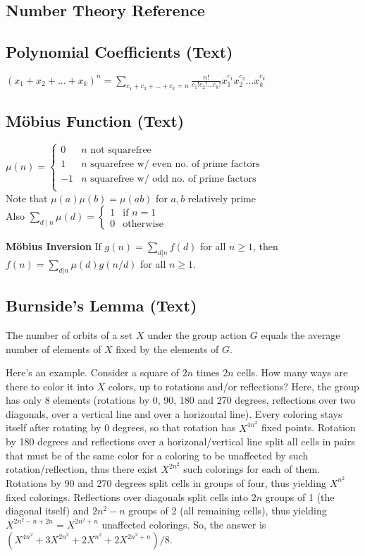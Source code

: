 \documentclass[9pt]{extarticle}
\begin{document}
\begin{multicols*}{3}
\section{Number Theory Reference}
\subsection{Polynomial Coefficients (Text)} %
$(x_1 + x_2 + ... + x_k)^n = \sum_{c_1 + c_2 + ... + c_k = n}
\frac{n!}{c_1! c_2! ... c_k!} x_1^{c_1} x_2^{c_2} ... x_k^{c_k}$

\subsection{M\"obius Function (Text)} %
$\mu(n) = \begin{cases}
0 & \text{$n$ not squarefree} \\
1 & \text{$n$ squarefree w/ even no. of prime factors} \\
-1 & \text{$n$ squarefree w/ odd no. of prime factors} \\
\end{cases}$ \\
Note that $\mu(a) \mu(b) = \mu(ab)$ for $a, b$ relatively prime \\
Also $\sum_{d \mid n} \mu(d) = \begin{cases} 1 & \text{if $n = 1$} \\
0 & \text{otherwise} \end{cases}$

\textbf{M\"obius Inversion}
If $g(n) = \sum_{d|n} f(d)$ for all $n \ge 1$, then
$f(n) = \sum_{d|n} \mu(d)g(n/d)$ for all $n \ge 1$.

\subsection{Burnside's Lemma (Text)} %
The number of orbits of a set $X$ under the group action $G$ equals the average
number of elements of $X$ fixed by the elements of $G$.

Here's an example. Consider a square of $2n$ times $2n$ cells. How many ways
are there to color it into $X$ colors, up to rotations and/or reflections?
Here, the group has only 8 elements (rotations by 0, 90, 180 and 270 degrees,
reflections over two diagonals, over a vertical line and over a horizontal
line). Every coloring stays itself after rotating by 0 degrees, so that
rotation has $X^{4n^2}$ fixed points. Rotation by 180 degrees and reflections
over a horizonal/vertical line split all cells in pairs that must be of the
same color for a coloring to be unaffected by such rotation/reflection, thus
there exist $X^{2n^2}$ such colorings for each of them. Rotations by 90 and 270
degrees split cells in groups of four, thus yielding $X^{n^2}$ fixed colorings.
Reflections over diagonals split cells into $2n$ groups of 1 (the diagonal
itself) and $2n^2-n$ groups of 2 (all remaining cells), thus yielding
$X^{2n^2-n+2n}=X^{2n^2+n}$ unaffected colorings.  So, the answer is
$(X^{4n^2}+3X^{2n^2}+2X^{n^2}+2X^{2n^2+n})/8$.


\end{multicols*}
\end{document}
